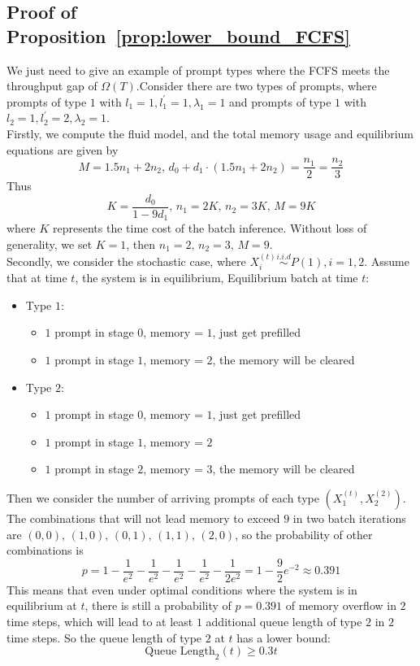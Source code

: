 \subsection{Proof of Proposition~\ref{prop:lower_bound_FCFS}}\label{appendix::proof of lower bound of of FCFS}
We just need to give an example of prompt types where the FCFS meets the throughput gap of $\Omega(T)$.Consider there are two types of prompts, where prompts of type $1$ with $l_1=1, l_1^\prime=1, \lambda_1=1$ and prompts of type $1$ with $l_2=1, l_2^\prime=2, \lambda_2=1$. \\
Firstly, we compute the fluid model, and the total memory usage and equilibrium equations are given by
$$M = 1.5n_1+2n_2,\, d_0+d_1\cdot (1.5n_1+2n_2) = \frac{n_1}{2}=\frac{n_2}{3}$$
Thus
$$K = \frac{d_0}{1-9d_1},\, n_1 = 2K,\, n_2=3K,\, M=9K$$
where $K$ represents the time cost of the batch inference. Without loss of generality, we set $K=1$, then $n_1=2, \,n_2=3,\,M=9 $. \\
Secondly, we consider the stochastic case, where $X_i^{(t)}\overset{i.i.d}{\sim} P(1), i=1,2$. Assume that at time $t$, the system is in equilibrium, Equilibrium batch at time $t$:
\begin{itemize}
    \item Type $1$:
    \begin{itemize}
        \itemsep0em
        \item $1$ prompt in stage $0$, memory = $1$, just get prefilled
        \item $1$ prompt in stage $1$, memory = $2$, the memory will be cleared
    \end{itemize}
    \item Type $2$:
    \begin{itemize}
        \itemsep0em
        \item $1$ prompt in stage $0$, memory = $1$, just get prefilled
        \item $1$ prompt in stage $1$, memory = $2$
        \item $1$ prompt in stage $2$, memory = $3$, the memory will be cleared
    \end{itemize}
\end{itemize}
Then we consider the number of arriving prompts of each type $(X_1^{(t)}, X_2^{(2)})$. The combinations that will not lead memory to exceed $9$ in two batch iterations are $(0,0),\,(1,0),\,(0,1),\,(1,1),\,(2,0)$, so the probability of other combinations is 
$$p = 1 - \frac{1}{e^2}- \frac{1}{e^2}- \frac{1}{e^2}- \frac{1}{e^2}- \frac{1}{2e^2}=1- \frac{9}{2}e^{-2} \approx 0.391 $$
This means that even under optimal conditions where the system is in equilibrium at $t$, there is still a probability of $p = 0.391$ of memory overflow in $2$ time steps, which will lead to at least $1$ additional queue length of type $2$ in $2$ time steps. So the queue length of type $2$ at $t$ has a lower bound:
$$\text{Queue Length}_2(t) \geq 0.3t$$


